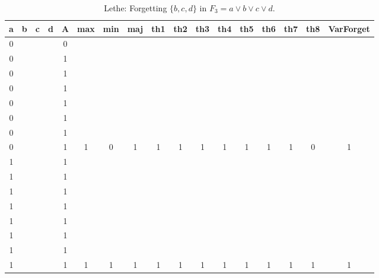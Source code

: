 \begin{table}[!tb]
    \centering
    \begin{tabular}{|c|c|c|c|c|c|c|c|c|c|c|c|c|c|c|c|c|}
        \hline
        \textbf{a} & \textbf{b} & \textbf{c} & \textbf{d} & \textbf{A} & \textbf{max} & \textbf{min} & \textbf{maj} & \textbf{th1} & \textbf{th2} & \textbf{th3} & \textbf{th4} & \textbf{th5} & \textbf{th6} & \textbf{th7} & \textbf{th8} & \textbf{VarForget} \\ \hline
        \rowcolor{gray!40} 0 &  &  &  & 0 &  &  &  &  &  &  &  &  &  &  &  &  \\ \hline
        \rowcolor{gray!40} 0 &  &  &  & 1 &  &  &  &  &  &  &  &  &  &  &  &  \\ \hline
        \rowcolor{gray!40} 0 &  &  &  & 1 &  &  &  &  &  &  &  &  &  &  &  &  \\ \hline
        \rowcolor{gray!40} 0 &  &  &  & 1 &  &  &  &  &  &  &  &  &  &  &  &  \\ \hline
        \rowcolor{gray!40} 0 &  &  &  & 1 &  &  &  &  &  &  &  &  &  &  &  &  \\ \hline
        \rowcolor{gray!40} 0 &  &  &  & 1 &  &  &  &  &  &  &  &  &  &  &  &  \\ \hline
        \rowcolor{gray!40} 0 &  &  &  & 1 &  &  &  &  &  &  &  &  &  &  &  &  \\ \hline
        \rowcolor{gray!40} 0 &  &  &  & 1 & 1 & 0 & 1 & 1 & 1 & 1 & 1 & 1 & 1 & 1 & 0 & 1 \\ \hline
        \rowcolor{blue!40} 1 &  &  &  & 1 &  &  &  &  &  &  &  &  &  &  &  &  \\ \hline
        \rowcolor{blue!40} 1 &  &  &  & 1 &  &  &  &  &  &  &  &  &  &  &  &  \\ \hline
        \rowcolor{blue!40} 1 &  &  &  & 1 &  &  &  &  &  &  &  &  &  &  &  &  \\ \hline
        \rowcolor{blue!40} 1 &  &  &  & 1 &  &  &  &  &  &  &  &  &  &  &  &  \\ \hline
        \rowcolor{blue!40} 1 &  &  &  & 1 &  &  &  &  &  &  &  &  &  &  &  &  \\ \hline
        \rowcolor{blue!40} 1 &  &  &  & 1 &  &  &  &  &  &  &  &  &  &  &  &  \\ \hline
        \rowcolor{blue!40} 1 &  &  &  & 1 &  &  &  &  &  &  &  &  &  &  &  &  \\ \hline
        \rowcolor{blue!40} 1 &  &  &  & 1 & 1 & 1 & 1 & 1 & 1 & 1 & 1 & 1 & 1 & 1 & 1 & 1 \\ \hline
    \end{tabular}
    \caption{Lethe: Forgetting $\{b, c, d\}$ in $F_{3} = a \lor b \lor c \lor d$.}
    \label{tab:lethe-F3-bcd}
\end{table}

